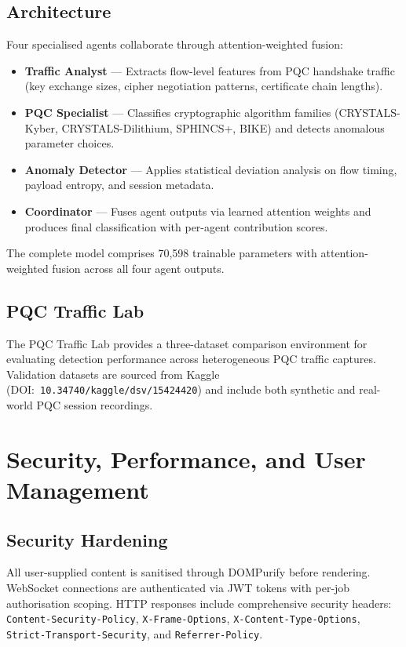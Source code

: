 \documentclass[11pt,a4paper]{article}
\begin{document}
\subsection{Architecture}
Four specialised agents collaborate through attention-weighted fusion:
\begin{itemize}
  \item \textbf{Traffic Analyst} --- Extracts flow-level features from
        PQC handshake traffic (key exchange sizes, cipher negotiation
        patterns, certificate chain lengths).
  \item \textbf{PQC Specialist} --- Classifies cryptographic algorithm
        families (CRYSTALS-Kyber, CRYSTALS-Dilithium, SPHINCS+, BIKE)
        and detects anomalous parameter choices.
  \item \textbf{Anomaly Detector} --- Applies statistical deviation
        analysis on flow timing, payload entropy, and session metadata.
  \item \textbf{Coordinator} --- Fuses agent outputs via learned
        attention weights and produces final classification with
        per-agent contribution scores.
\end{itemize}

The complete model comprises 70,598 trainable parameters with
attention-weighted fusion across all four agent outputs.

\subsection{PQC Traffic Lab}
The PQC Traffic Lab provides a three-dataset comparison environment
for evaluating detection performance across heterogeneous PQC traffic
captures.  Validation datasets are sourced from Kaggle
(DOI:~\texttt{10.34740/kaggle/dsv/15424420}) and include both synthetic
and real-world PQC session recordings.

\section{Security, Performance, and User Management}
\label{sec:security_performance}

\subsection{Security Hardening}
All user-supplied content is sanitised through DOMPurify before rendering.
WebSocket connections are authenticated via JWT tokens with per-job
authorisation scoping.  HTTP responses include comprehensive security
headers: \texttt{Content-Security-Policy}, \texttt{X-Frame-Options},
\texttt{X-Content-Type-Options}, \texttt{Strict-Transport-Security},
and \texttt{Referrer-Policy}.
\end{document}
